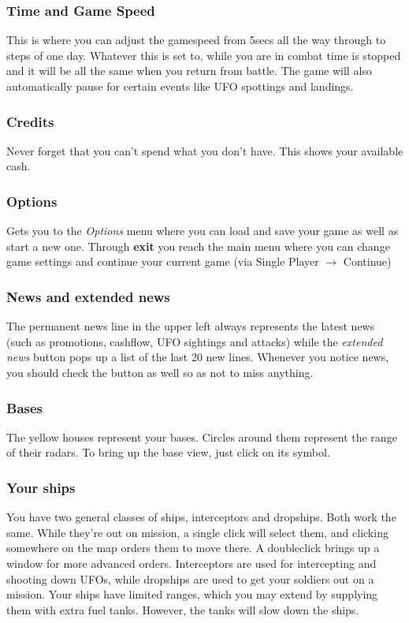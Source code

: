 \subsubsection{Time and Game Speed}
This is where you can adjust the gamespeed from 5secs all the way through to steps of one day. Whatever this is set to, while you are in combat time is stopped and it will be all the same when you return from battle.  The game will also automatically pause for certain events like UFO spottings and landings.

\subsubsection{Credits}
Never forget that you can't spend what you don't have.  This shows your available cash.

\subsubsection{Options}
Gets you to the \emph{Options} menu where you can load and save your game as well as start a new one.
Through \textbf{exit} you reach the main menu where you can change game settings and continue your current game (via Single Player $\rightarrow$ Continue)

\subsubsection{News and extended news}
The permanent news line in the upper left always represents the latest news (such as promotions, cashflow, UFO sightings and attacks) while the \emph{extended news} button pops up a list of the last 20 new lines.  Whenever you notice news, you should check the button as well so as not to miss anything.

\subsubsection{Bases}
The yellow houses represent your bases. Circles around them represent the range of their radars. To bring up the base view, just click on its symbol.

\subsubsection{Your ships}
You have two general classes of ships, interceptors and dropships.  Both work the same.  While they're out on mission, a single click will select them, and clicking somewhere on the map orders them to move there.  A doubleclick brings up a window for more advanced orders.  Interceptors are used for intercepting and shooting down UFOs, while dropships are used to get your soldiers out on a mission.  Your ships have limited ranges, which you may extend by supplying them with extra fuel tanks.  However, the tanks will slow down the ships.

